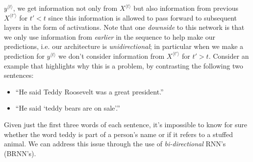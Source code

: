 \documentclass[12pt]{article}
\begin{document}
$y^{\langle t \rangle}$, we get information not only from
$X^{\langle t \rangle}$ but also information from previous
$X^{\langle t' \rangle}$ for $t' < t$ since this information is allowed to pass forward to subsequent layers in the form of activations. Note that one \emph{downside} to this network is that we only use information from \emph{earlier} in the sequence to help make our predictions, i.e. our architecture is \emph{unidirectional}; in particular when we make a prediction for $y^{\langle t \rangle}$ we don't consider information from $X^{\langle t' \rangle}$ for $t' > t$. Consider an example that highlights why this is a problem, by contrasting the following two sentences:
\begin{itemize}
\item ``He said Teddy Roosevelt was a great president.''
\item ``He said `teddy bears are on sale'.''
\end{itemize}
Given just the first three words of each sentence, it's impossible to know for sure whether the word teddy is part of a person's name or if it refers to a stuffed animal. We can address this issue through the use of \emph{bi-directional} RNN's (BRNN's).
\end{document}
